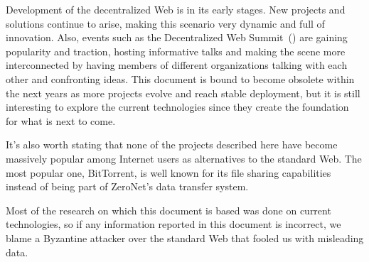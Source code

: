 \documentclass[mscthesis]{usiinfthesis}
\begin{document}
Development of the decentralized Web is in its early stages. New projects and solutions continue to arise, making this scenario very dynamic and full of innovation. Also, events such as the Decentralized Web Summit~(\cite{website:dws}) are gaining popularity and traction, hosting informative talks and making the scene more interconnected by having members of different organizations talking with each other and confronting ideas. This document is bound to become obsolete within the next years as more projects evolve and reach stable deployment, but it is still interesting to explore the current technologies since they create the foundation for what is next to come.

It's also worth stating that none of the projects described here have become massively popular among Internet users as alternatives to the standard Web. The most popular one, BitTorrent, is well known for its file sharing capabilities instead of being part of ZeroNet's data transfer system. %

Most of the research on which this document is based was done on current technologies, so if any information reported in this document is incorrect, we blame a Byzantine attacker over the standard Web that fooled us with misleading data.


\backmatter


%
%


\end{document}
